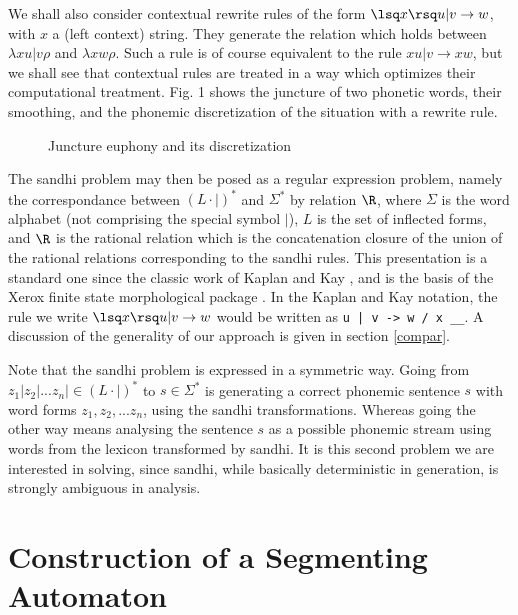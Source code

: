 We shall also consider contextual rewrite rules of the form
$\lsq x\rsq u|v\rightarrow w$, with $x$ a (left context) string. They
generate the relation which holds between $\lambda x u | v \rho$ and 
$\lambda x w \rho$. Such a rule is of course equivalent to the rule
$xu|v\rightarrow x w$, but we shall see that contextual 
rules are treated in a
way which optimizes their computational treatment. 
Fig. 1
shows the juncture of two phonetic words, their smoothing, and the 
phonemic discretization of the situation with a rewrite rule.
\begin{figure}[htb]
\begin{center}
\end{center}
\label{fig1}
\caption{Juncture euphony and its discretization}
\end{figure}

The sandhi problem may then be posed as a regular expression problem, namely
the correspondance between $(L\cdot |)^{*}$ and $\Sigma^{*}$ by relation $\R$,
where $\Sigma$ is the word alphabet (not comprising the special symbol 
$|$), $L$ is the set of inflected forms, and $\R$ is the rational
relation which is the concatenation closure of the union of the
rational relations corresponding to the sandhi rules. This presentation
is a standard one since the classic work of Kaplan and Kay \cite{kk}, and is 
the basis of the Xerox finite state morphological 
package \cite{karttunen1,karttunen2,beeskar}. 
In the Kaplan and Kay notation, the rule we write $\lsq x\rsq u|v\rightarrow w$
would be written as \verb:u | v -> w / x __:. 
A discussion of the generality
of our approach is given in section \ref{compar}.

Note that the sandhi problem is expressed in a symmetric way. Going from
$z_1|z_2|...z_n|\in(L\cdot |)^{*}$ to $s\in\Sigma^{*}$ is generating
a correct phonemic sentence $s$ with word forms $z_1,z_2,...z_n$, using
the sandhi transformations. Whereas going the other way means analysing the
sentence $s$ as a possible phonemic stream using words from the lexicon
transformed by sandhi. It is this second problem we are interested in solving,
since sandhi, while basically
deterministic in generation, is strongly ambiguous in analysis. 

\section{Construction of a Segmenting Automaton}
\label{segment} 

